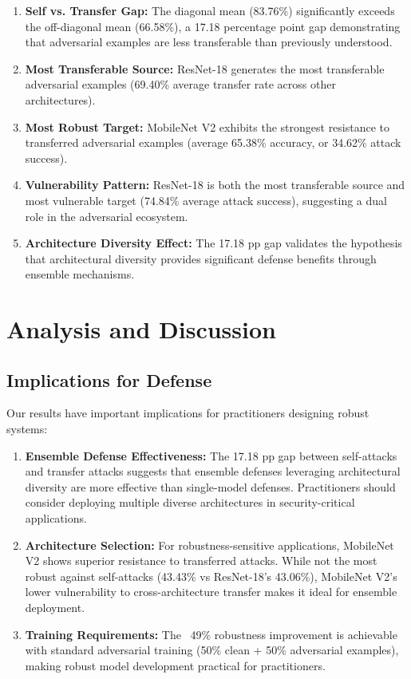 \documentclass[10pt,conference]{IEEEtran}
\begin{document}
\begin{enumerate}
    \item \textbf{Self vs. Transfer Gap:} The diagonal mean (83.76\%) significantly exceeds the off-diagonal mean (66.58\%), a 17.18 percentage point gap demonstrating that adversarial examples are less transferable than previously understood.
    
    \item \textbf{Most Transferable Source:} ResNet-18 generates the most transferable adversarial examples (69.40\% average transfer rate across other architectures).
    
    \item \textbf{Most Robust Target:} MobileNet V2 exhibits the strongest resistance to transferred adversarial examples (average 65.38\% accuracy, or 34.62\% attack success).
    
    \item \textbf{Vulnerability Pattern:} ResNet-18 is both the most transferable source and most vulnerable target (74.84\% average attack success), suggesting a dual role in the adversarial ecosystem.
    
    \item \textbf{Architecture Diversity Effect:} The 17.18 pp gap validates the hypothesis that architectural diversity provides significant defense benefits through ensemble mechanisms.
\end{enumerate}

\section{Analysis and Discussion}
\label{sec:analysis}

\subsection{Implications for Defense}

Our results have important implications for practitioners designing robust systems:

\begin{enumerate}
    \item \textbf{Ensemble Defense Effectiveness:} The 17.18 pp gap between self-attacks and transfer attacks suggests that ensemble defenses leveraging architectural diversity are more effective than single-model defenses. Practitioners should consider deploying multiple diverse architectures in security-critical applications.
    
    \item \textbf{Architecture Selection:} For robustness-sensitive applications, MobileNet V2 shows superior resistance to transferred attacks. While not the most robust against self-attacks (43.43\% vs ResNet-18's 43.06\%), MobileNet V2's lower vulnerability to cross-architecture transfer makes it ideal for ensemble deployment.
    
    \item \textbf{Training Requirements:} The ~49\% robustness improvement is achievable with standard adversarial training (50\% clean + 50\% adversarial examples), making robust model development practical for practitioners.
\end{enumerate}
\end{document}
